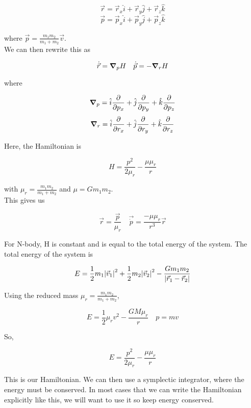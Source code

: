 \documentclass[]{article}
\begin{document}
\[\vec{r} = \vec{r}_x \hat{i} + \vec{r}_y \hat{j} + \vec{r}_z \hat{k}\]
\[\vec{p} = \vec{p}_x \hat{i} + \vec{p}_y \hat{j} + \vec{p}_z \hat{k}\] 

where $\vec{p} = \frac{m_1m_2}{m_1+m_2}\vec{v}$.\\

We can then rewrite this as 

\[\dot{\vec{r}} = \grad_p{H} \quad \dot{\vec{p}} = -\grad_r{H}\]

where 

\[\grad_p{} = \hat{i} \pdv{}{p_x}+ \hat{j} \pdv{}{p_y} + \hat{k} \pdv{}{p_z}\]
\[\grad_r{} = \hat{i} \pdv{}{r_x}+ \hat{j} \pdv{}{r_y} + \hat{k} \pdv{}{r_z}\]

Here, the Hamiltonian is 

\[H = \frac{p^2}{2\mu_r} - \frac{\mu\mu_r}{r}\]

with $\mu_r = \frac{m_1m_2}{m_1+m_2}$ and $\mu = Gm_1m_2$.\\

This gives us 

\[\vec{r} = \frac{\vec{p}}{\mu_r} \quad \vec{\dot{p}} = \frac{-\mu\mu_r}{r^3}\vec{r}\]


For N-body, H is constant and is equal to the total energy of the system. The total energy of the system is

\[E = \frac{1}{2}m_1\abs{\vec{v}_1}^2 + \frac{1}{2}m_2\abs{\vec{v}_2}^2 - \frac{Gm_1m_2}{\abs{\vec{r}_1 - \vec{r}_2}}\]

Using the reduced mass $\mu_r = \frac{m_1m_2}{m_1+m_2}$,

\[E = \frac{1}{2}\mu_r v^2 - \frac{GM\mu_r}{r} \quad p = mv\]

So,

\[E = \frac{p^2}{2\mu_r} - \frac{\mu\mu_r}{r}\]

This is our Hamiltonian. We can then use a symplectic integrator, where the energy must be conserved. In most cases that we can write the Hamiltonian explicitly like this, we will want to use it so keep energy conserved.
\end{document}
